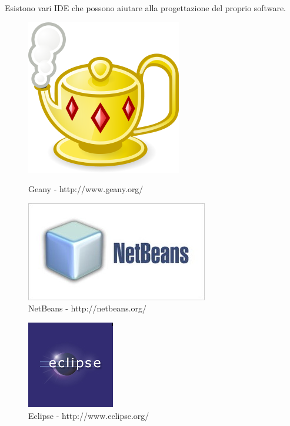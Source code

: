 \begin{frame}
\begin{block}{}
Esistono vari IDE che possono aiutare alla progettazione del proprio software.
\end{block}
\begin{figure}
\begin{center}
\begin{minipage}{0.4\textwidth}
\includegraphics[scale = 0.3]{images/geany.png}
\caption{Geany - http://www.geany.org/}
\end{minipage}
\begin{minipage}{0.4\textwidth}
\includegraphics[scale=0.3]{images/netbeans.jpg}
\caption{NetBeans - http://netbeans.org/}
\end{minipage}
\end{center}
\end{figure}
\begin{figure}
\includegraphics[scale=0.3]{images/eclipse.jpg}
\caption{Eclipse - http://www.eclipse.org/}
\end{figure}
\end{frame}

